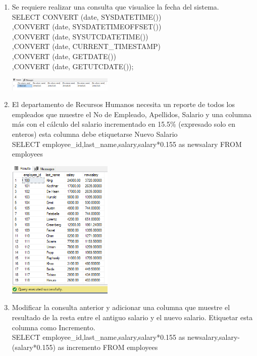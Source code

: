 	
\begin{enumerate}[1.]
	\item Se requiere realizar una consulta que visualice la fecha del sistema.
	\\SELECT CONVERT (date, SYSDATETIME())
    \\,CONVERT (date, SYSDATETIMEOFFSET())
    \\,CONVERT (date, SYSUTCDATETIME())
    \\,CONVERT (date, CURRENT\_TIMESTAMP)
    \\,CONVERT (date, GETDATE())
    \\,CONVERT (date, GETUTCDATE());
    \begin{center}
	\includegraphics[width=5cm]{./Imagenes/actividad_05_01}
	\end{center}
	\item El departamento de Recursos Humanos necesita un reporte de todos los empleados que muestre el No de Empleado, Apellidos, Salario y una columna más con el cálculo del salario incrementado en 15.5\% (expresado solo en enteros) esta columna debe etiquetarse Nuevo Salario
	\\SELECT employee\_id,last\_name,salary,salary*0.155 as newsalary FROM employees
	 \begin{center}
	\includegraphics[width=5cm]{./Imagenes/actividad_05_02}
	\end{center}
	\item Modificar la consulta anterior y adicionar una columna que muestre el resultado de la resta entre el antiguo salario y el nuevo salario. Etiquetar esta columna como Incremento.
	\\SELECT employee\_id,last\_name,salary,salary*0.155 as newsalary,salary-(salary*0.155) as incremento FROM employees
	\begin{center}

\end{center}
\end{enumerate}
